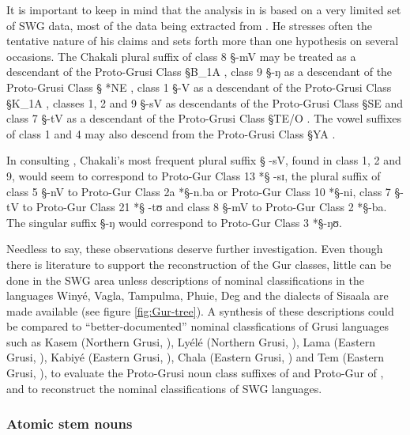 It is important to keep in mind that the analysis in \cite{Mane69a, Mane69b} is
based on a very
limited set of SWG data,  most of the data being extracted from
\cite{Bend65}. He
stresses often the tentative nature of his claims and  sets forth more than one
 hypothesis on several occasions. The Chakali plural suffix of class 8 {\S -mV}
may be treated as a descendant of the Proto-Grusi Class {\S *B_{1}A}
\citep[32]{Mane69b}, class 9 {\S -ŋ} as a descendant of the Proto-Grusi Class
{\S
*NE}   \citep[37,41]{Mane69b}, class 1 {\S -V} as a descendant of the
Proto-Grusi
Class {\S *K_{1}A}  \citep[39]{Mane69b}, classes 1, 2 and 9 {\S -sV} as 
descendants
of the Proto-Grusi Class  {\S *SE}  \citep[39]{Mane69b} and class 7 {\S -tV} as
a descendant of the Proto-Grusi Class {\S *TE/O}  \citep[43]{Mane69b}. The vowel
suffixes of class 1 and 4 may also descend from the Proto-Grusi Class {\S *YA}
\citep[34]{Mane69b}. 

In consulting \citet[7-22]{Mieh06}, Chakali's  most frequent plural suffix  {\S
-sV}, found in class 1, 2 and 9, would seem to correspond to Proto-Gur Class 13
*{\S
-sɪ}, the plural suffix of class 5 {\S -nV} to  Proto-Gur Class 2a *{\S -n.ba}
or Proto-Gur Class 10 *{\S -ni}, class 7 {\S -tV} to Proto-Gur Class 21 *{\S
-tʊ} and class 8  {\S -mV}  to Proto-Gur Class 2 *{\S -ba}. The singular suffix
{\S -ŋ} would correspond to Proto-Gur Class 3 *{\S -ŋʊ}.


Needless to say, these observations  deserve further investigation. Even though
there is  literature to support the reconstruction of the Gur classes, little
can be done in the SWG
area unless descriptions of  nominal classifications in the languages  Winyé,
Vagla, Tampulma, Phuie,  Deg  and the dialects of Sisaala  are made available
(see  
figure \ref{fig:Gur-tree}).
A synthesis of these
descriptions could be
compared to  ``better-documented'' nominal classfications of Grusi languages 
such as Kasem (Northern Grusi, \cite{Awed79, Bonv88, Awed03}),  Lyélé (Northern
Grusi, \cite{Delp79}),  Lama  (Eastern Grusi, \cite{Arit87, Ours89}), Kabiyé
(Eastern Grusi, \cite{Tcha07}),  Chala   (Eastern Grusi, \cite{Klei00}) and Tem
(Eastern Grusi, \cite{Tcha72, Tcha07}), to evaluate the Proto-Grusi noun class
suffixes of \cite{Mane69b} and Proto-Gur of \cite{Mieh06}, and to reconstruct
the nominal classifications of SWG  languages.


\subsubsection{Atomic stem nouns}
\label{sec:GRM-sim-bas-noun}

